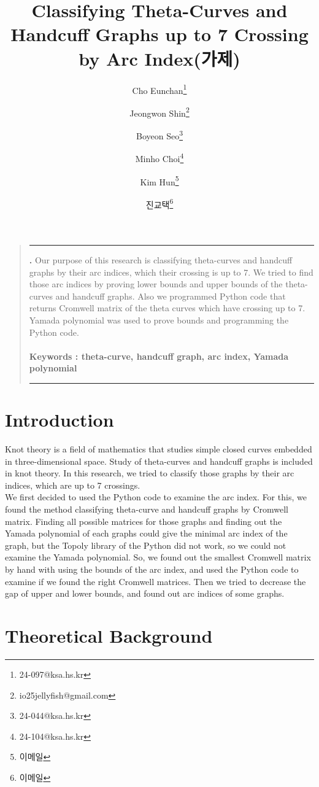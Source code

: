 \documentclass{article}
\title{\textbf{Classifying Theta-Curves and Handcuff Graphs up to 7 Crossing by Arc Index(가제)}}
\author[1]{Cho Eunchan\thanks{24-097@ksa.hs.kr}}
\author[1]{Jeongwon Shin\thanks{io25jellyfish@gmail.com}}
\author[1]{Boyeon Seo\thanks{24-044@ksa.hs.kr}}
\author[1]{Minho Choi\thanks{24-104@ksa.hs.kr}}
\author[2]{Kim Hun\thanks{이메일}}
\author[3]{진교택\thanks{이메일}}
\affil[1]{Researcher, Korea Scinece Academy of KAIST}
\affil[2]{Supervisor, Department of Mechanical Engineering, \LaTeX\ University}
\affil[3]{Co-Supervisor, Department of Computer Science, \LaTeX\ University}
\date{\vspace{-5ex}}
\theoremstyle{definition}
\theoremstyle{theorem}
\theoremstyle{proposition}
\theoremstyle{corollary}
\begin{document}
\maketitle
\renewenvironment{abstract}
{\begin{quote}
\noindent \rule{\linewidth}{.5pt}\par{\bfseries \abstractname.}}
{\medskip\noindent \rule{\linewidth}{.5pt}
\end{quote}
}


\begin{abstract}
Our purpose of this research is classifying theta-curves and handcuff graphs by their arc indices, which their crossing is up to 7.
We tried to find those arc indices by proving lower bounds and upper bounds of the theta-curves and handcuff graphs.
Also we programmed Python code that returns Cromwell matrix of the theta curves which have crossing up to 7.
Yamada polynomial was used to prove bounds and programming the Python code.\\ \\
\textbf{Keywords : theta-curve, handcuff graph, arc index, Yamada polynomial}
\\
\end{abstract}


\section{Introduction}
Knot theory is a field of mathematics that studies simple closed curves embedded in three-dimensional space.
Study of theta-curves and handcuff graphs is included in knot theory.
In this research, we tried to classify those graphs by their arc indices, which are up to 7 crossings.\\


We first decided to used the Python code to examine the arc index.
For this, we found the method classifying theta-curve and handcuff graphs by Cromwell matrix.
Finding all possible matrices for those graphs and finding out the Yamada polynomial of each graphs could give the minimal arc index of the graph, but the Topoly library of the Python did not work, so we could not examine the Yamada polynomial.
So, we found out the smallest Cromwell matrix by hand with using the bounds of the arc index, and used the Python code to examine if we found the right Cromwell matrices.
Then we tried to decrease the gap of upper and lower bounds, and found out arc indices of some graphs.

\section{Theoretical Background}
\end{document}

